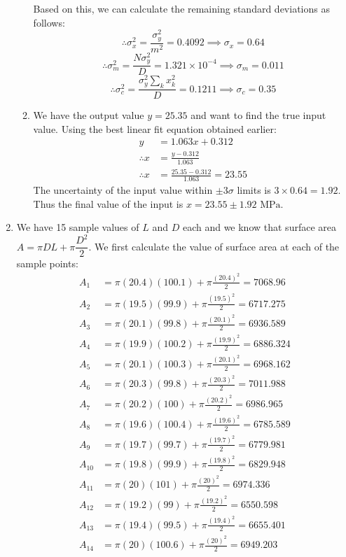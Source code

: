 \documentclass[a4paper, 11pt]{article}
\begin{document}
\begin{enumerate}[label=(\arabic*),leftmargin=*]
\begin{enumerate}[label=\roman*)]
Based on this, we can calculate the remaining standard deviations as follows:
$$\therefore \sigma_x^2=\frac{\sigma_y^2}{m^2}=0.4092\implies\boxed{\sigma_x=0.64}$$
$$\therefore \sigma_m^2=\frac{N\sigma_y^2}{D}=1.321\times 10^{-4}\implies\boxed{\sigma_m=0.011}$$
$$\therefore \sigma_c^2=\frac{\sigma_y^2\sum_k x_k^2}{D}=0.1211\implies\boxed{\sigma_c=0.35}$$
	\item We have the output value $y=25.35$ and want to find the true input value. Using the best linear fit equation obtained earlier:
	\begin{align*}
		y&=1.063x+0.312\\
		\therefore x&=\frac{y-0.312}{1.063}\\
		\therefore x&=\frac{25.35-0.312}{1.063}=23.55
	\end{align*}
The uncertainty of the input value within $\pm 3\sigma$ limits is $3\times 0.64=1.92$. Thus the final value of the input is $\boxed{x=23.55\pm 1.92\text{ MPa}}$.
\newpage
\end{enumerate}
	\item We have 15 sample values of $L$ and $D$ each and we know that surface area $A=\pi DL+\pi\dfrac{D^2}{2}$. We first calculate the value of surface area at each of the sample points:
\begin{align*}
	A_1&=\pi(20.4)(100.1)+\pi\frac{(20.4)^2}{2}=7068.96\\
	A_2&=\pi(19.5)(99.9)+\pi\frac{(19.5)^2}{2}=6717.275\\
	A_3&=\pi(20.1)(99.8)+\pi\frac{(20.1)^2}{2}=6936.589\\
	A_4&=\pi(19.9)(100.2)+\pi\frac{(19.9)^2}{2}=6886.324\\
	A_5&=\pi(20.1)(100.3)+\pi\frac{(20.1)^2}{2}=6968.162\\
	A_6&=\pi(20.3)(99.8)+\pi\frac{(20.3)^2}{2}=7011.988\\
	A_7&=\pi(20.2)(100)+\pi\frac{(20.2)^2}{2}=6986.965\\
	A_8&=\pi(19.6)(100.4)+\pi\frac{(19.6)^2}{2}=6785.589\\
	A_9&=\pi(19.7)(99.7)+\pi\frac{(19.7)^2}{2}=6779.981\\
	A_{10}&=\pi(19.8)(99.9)+\pi\frac{(19.8)^2}{2}=6829.948\\
	A_{11}&=\pi(20)(101)+\pi\frac{(20)^2}{2}=6974.336\\
	A_{12}&=\pi(19.2)(99)+\pi\frac{(19.2)^2}{2}=6550.598\\
	A_{13}&=\pi(19.4)(99.5)+\pi\frac{(19.4)^2}{2}=6655.401\\
	A_{14}&=\pi(20)(100.6)+\pi\frac{(20)^2}{2}=6949.203\\

\end{align*}
\end{enumerate}
\end{document}
